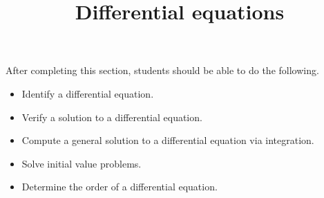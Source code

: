 \documentclass{ximera}
\title{Differential equations}
\begin{document}
\begin{abstract}
\end{abstract}

\maketitle

\begin{sectionOutcomes}

After completing this section, students should be able to do the following.

\begin{itemize}
\item Identify a differential equation.
\item Verify a solution to a differential equation.
\item Compute a general solution to a differential equation via integration.
\item Solve initial value problems.
\item Determine the order of a differential equation.
\end{itemize}

\end{sectionOutcomes}
\end{document}
